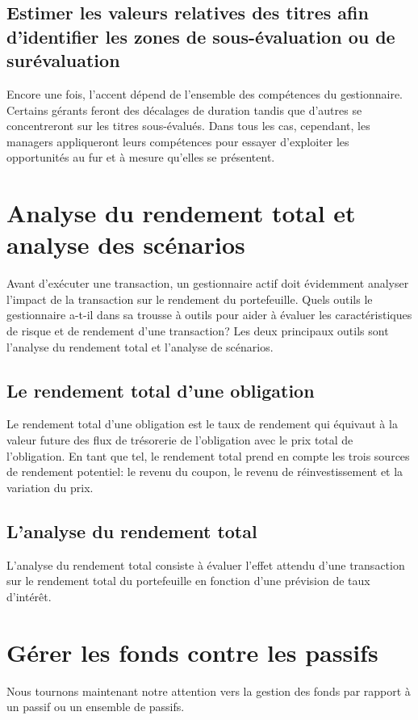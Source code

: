 \documentclass[12pt]{article}
\begin{document}
\subsection{Estimer les valeurs relatives des titres afin d'identifier les zones de sous-évaluation ou de surévaluation}
Encore une fois, l'accent dépend de l'ensemble des compétences du gestionnaire. Certains gérants feront des décalages de duration tandis que d'autres se concentreront sur les titres sous-évalués. Dans tous les cas, cependant, les managers appliqueront leurs compétences pour essayer d'exploiter les opportunités au fur et à mesure qu'elles se présentent.
\section{Analyse du rendement total et analyse des scénarios}
Avant d’exécuter une transaction, un gestionnaire actif doit évidemment analyser l’impact de la transaction sur le rendement du portefeuille. Quels outils le gestionnaire a-t-il dans sa trousse à outils pour aider à évaluer les caractéristiques de risque et de rendement d'une transaction? Les deux principaux outils sont l'analyse du rendement total et l'analyse de scénarios.
\subsection{Le rendement total d’une obligation}
Le rendement total d’une obligation est le taux de rendement qui équivaut à la valeur future des flux de trésorerie de l’obligation avec le prix total de l’obligation. En tant que tel, le rendement total prend en compte les trois sources de rendement potentiel: le revenu du coupon, le revenu de réinvestissement et la variation du prix. 
\subsection{L’analyse du rendement total}
L’analyse du rendement total consiste à évaluer l’effet attendu d’une transaction sur le rendement total du portefeuille en fonction d’une prévision de taux d’intérêt.

\section{Gérer les fonds contre les passifs}
Nous tournons maintenant notre attention vers la gestion des fonds par rapport à un passif ou un ensemble de passifs.
\end{document}
